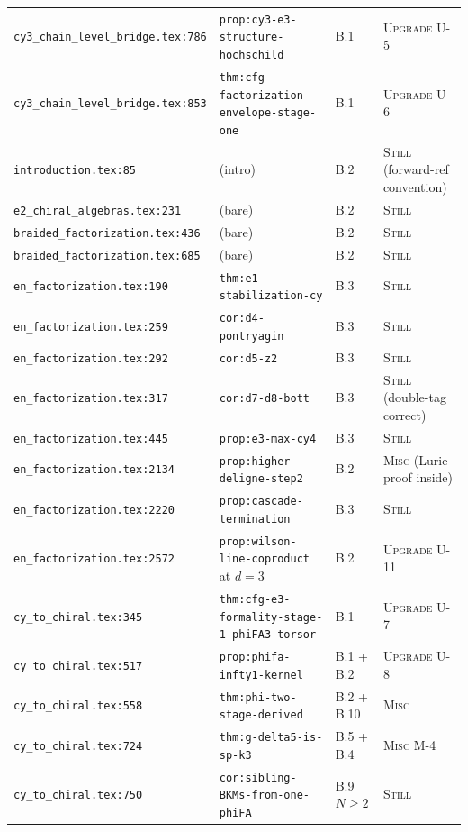 \documentclass[11pt]{amsart}
\begin{document}
{{\begin{longtable}{@{}p{5.5cm}p{3cm}p{2cm}p{3.5cm}@{}}
\texttt{cy3\_chain\_level\_bridge.tex:786} & \texttt{prop:cy3-e3-structure-hochschild} & B.1 & \textsc{Upgrade} U-5 \\
\texttt{cy3\_chain\_level\_bridge.tex:853} & \texttt{thm:cfg-factorization-envelope-stage-one} & B.1 & \textsc{Upgrade} U-6 \\
\texttt{introduction.tex:85} & (intro) & B.2 & \textsc{Still} (forward-ref convention) \\
\texttt{e2\_chiral\_algebras.tex:231} & (bare) & B.2 & \textsc{Still} \\
\texttt{braided\_factorization.tex:436} & (bare) & B.2 & \textsc{Still} \\
\texttt{braided\_factorization.tex:685} & (bare) & B.2 & \textsc{Still} \\
\texttt{en\_factorization.tex:190} & \texttt{thm:e1-stabilization-cy} & B.3 & \textsc{Still} \\
\texttt{en\_factorization.tex:259} & \texttt{cor:d4-pontryagin} & B.3 & \textsc{Still} \\
\texttt{en\_factorization.tex:292} & \texttt{cor:d5-z2} & B.3 & \textsc{Still} \\
\texttt{en\_factorization.tex:317} & \texttt{cor:d7-d8-bott} & B.3 & \textsc{Still} (double-tag correct) \\
\texttt{en\_factorization.tex:445} & \texttt{prop:e3-max-cy4} & B.3 & \textsc{Still} \\
\texttt{en\_factorization.tex:2134} & \texttt{prop:higher-deligne-step2} & B.2 & \textsc{Misc} (Lurie proof inside) \\
\texttt{en\_factorization.tex:2220} & \texttt{prop:cascade-termination} & B.3 & \textsc{Still} \\
\texttt{en\_factorization.tex:2572} & \texttt{prop:wilson-line-coproduct} at $d=3$ & B.2 & \textsc{Upgrade} U-11 \\
\texttt{cy\_to\_chiral.tex:345} & \texttt{thm:cfg-e3-formality-stage-1-phiFA3-torsor} & B.1 & \textsc{Upgrade} U-7 \\
\texttt{cy\_to\_chiral.tex:517} & \texttt{prop:phifa-infty1-kernel} & B.1 + B.2 & \textsc{Upgrade} U-8 \\
\texttt{cy\_to\_chiral.tex:558} & \texttt{thm:phi-two-stage-derived} & B.2 + B.10 & \textsc{Misc} \\
\texttt{cy\_to\_chiral.tex:724} & \texttt{thm:g-delta5-is-sp-k3} & B.5 + B.4 & \textsc{Misc} M-4 \\
\texttt{cy\_to\_chiral.tex:750} & \texttt{cor:sibling-BKMs-from-one-phiFA} & B.9 $N\geq 2$ & \textsc{Still} \\

\end{longtable}}}
\end{document}
